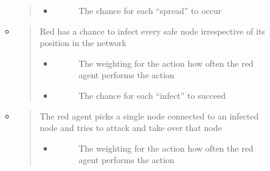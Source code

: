 \documentclass[letterpaper,10pt,english]{sphinxmanual}
\begin{document}
\begin{itemize}
\begin{description}
\begin{itemize}
\begin{quote}
\begin{itemize}
\item {} \begin{description}
\item[{}] \leavevmode
\sphinxAtStartPar
The chance for each “spread” to occur

\end{description}

\end{itemize}
\end{quote}

\item {}
\sphinxAtStartPar
{}
\begin{quote}

\sphinxAtStartPar
Red has a chance to infect every safe node irrespective of its position in the network
\begin{itemize}
\item {} \begin{description}
\item[{}] \leavevmode
\sphinxAtStartPar
The weighting for the action \sphinxhyphen{} how often the red agent performs the action

\end{description}

\item {} \begin{description}
\item[{}] \leavevmode
\sphinxAtStartPar
The chance for each “infect” to succeed

\end{description}

\end{itemize}
\end{quote}

\item {}
\sphinxAtStartPar
{}
\begin{quote}

\sphinxAtStartPar
The red agent picks a single node connected to an infected node and tries to attack and take over that node
\begin{itemize}
\item {} \begin{description}
\item[{}] \leavevmode
\sphinxAtStartPar
The weighting for the action \sphinxhyphen{} how often the red agent performs the action


\end{description}
\end{itemize}
\end{quote}
\end{itemize}
\end{description}
\end{itemize}
\end{document}
